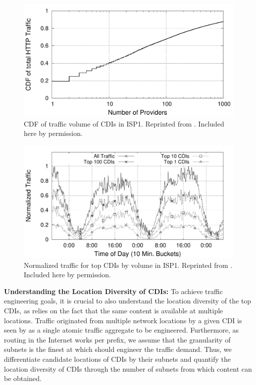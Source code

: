 \begin{figure}[tbp]
\center\includegraphics[width=1\linewidth]{figures-pdf/providersVsVolume}
\caption{CDF of traffic volume of CDIs in ISP1. Reprinted from \cite{Cate-CCR}. Included here by permission.}
\label{fig:CDF-Traffic-CPs}
\vspace{-1.5em}
\end{figure}


\begin{figure}[tbp]
\center\includegraphics[width=1\linewidth]{figures-pdf/Volume_timeseries}
\caption{Normalized traffic for top CDIs by volume in ISP1. Reprinted from \cite{Cate-CCR}. Included here by permission.}
\label{fig:CPs-Total-Traffic}
\vspace{-1.5em}
\end{figure}



\noindent\textbf{Understanding the Location Diversity of CDIs:}\label{sec:Traffic-by-Content-Provider}
To achieve traffic engineering goals, it is crucial to also understand the
location diversity of the top CDIs, as \cate relies on the fact that the same
content is available at multiple locations.  Traffic originated from multiple
network locations by a given CDI is seen by \cate as a single atomic traffic
aggregate to be engineered. Furthermore, as routing in the Internet works per
prefix, we assume that the granularity of subnets is the finest at which \cate
should engineer the traffic demand. Thus, we differentiate candidate locations
of CDIs by their subnets and quantify the location diversity of CDIs through the
number of subnets from which content can be obtained.


